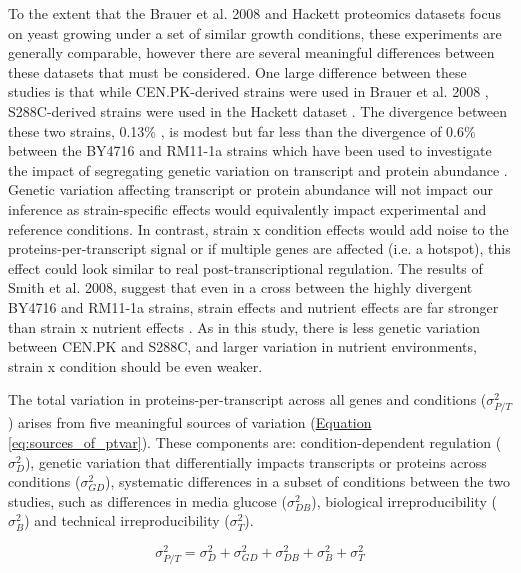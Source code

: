 To the extent that the Brauer et al. 2008 and Hackett proteomics datasets focus on yeast growing under a set of similar growth conditions, these experiments are generally comparable, however there are several meaningful differences between these datasets that must be considered. One large difference between these studies is that while CEN.PK-derived strains were used in Brauer et al. 2008 \cite{vanDijkenJP:2000er}, S288C-derived strains were used in the Hackett dataset \cite{Winston:1995io}. The divergence between these two strains, 0.13\% \cite{Schacherer:2007ck}, is modest but far less than the divergence of 0.6\% between the BY4716 and RM11-1a strains \cite{Foss:2007ej} which have been used to investigate the impact of segregating genetic variation on transcript and protein abundance \cite{Brem:2005gh, Foss:2007ej}. Genetic variation affecting transcript or protein abundance will not impact our inference as strain-specific effects would equivalently impact experimental and reference conditions. In contrast, strain x condition effects would add noise to the proteins-per-transcript signal or if multiple genes are affected (i.e. a hotspot), this effect could look similar to real post-transcriptional regulation. The results of Smith et al. 2008, suggest that even in a cross between the highly divergent BY4716 and RM11-1a strains, strain effects and nutrient effects are far stronger than strain x nutrient effects \cite{Smith:2008vy}. As in this study, there is less genetic variation between CEN.PK and S288C, and larger variation in nutrient environments, strain x condition should be even weaker.

The total variation in proteins-per-transcript across all genes and conditions ($\sigma^{2}_{P/T}$) arises from five meaningful sources of variation (\hyperref[eq:sources_of_ptvar]{Equation \ref{eq:sources_of_ptvar}}). These components are: condition-dependent regulation ($\sigma^{2}_{D}$), genetic variation that differentially impacts transcripts or proteins across conditions ($\sigma^{2}_{GD}$), systematic differences in a subset of conditions between the two studies, such as differences in media glucose ($\sigma^{2}_{DB}$), biological irreproducibility ($\sigma^{2}_{B}$) and technical irreproducibility ($\sigma^{2}_{T}$).

\begin{equation}
\sigma^{2}_{P/T} = \sigma^{2}_{D} + \sigma^{2}_{GD} + \sigma^{2}_{DB} + \sigma^{2}_{B} + \sigma^{2}_{T}\label{eq:sources_of_ptvar}
\end{equation}

